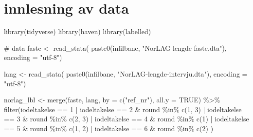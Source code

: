 \documentclass[
  letterpaper,
  DIV=11,
  numbers=noendperiod]{scrreprt}
\newenvironment{Shaded}{\begin{snugshade}}{\end{snugshade}}
\newcommand{\AttributeTok}[1]{\textcolor[rgb]{0.40,0.45,0.13}{#1}}
\newcommand{\CommentTok}[1]{\textcolor[rgb]{0.37,0.37,0.37}{#1}}
\newcommand{\ConstantTok}[1]{\textcolor[rgb]{0.56,0.35,0.01}{#1}}
\newcommand{\DecValTok}[1]{\textcolor[rgb]{0.68,0.00,0.00}{#1}}
\newcommand{\FunctionTok}[1]{\textcolor[rgb]{0.28,0.35,0.67}{#1}}
\newcommand{\NormalTok}[1]{\textcolor[rgb]{0.00,0.23,0.31}{#1}}
\newcommand{\OtherTok}[1]{\textcolor[rgb]{0.00,0.23,0.31}{#1}}
\newcommand{\SpecialCharTok}[1]{\textcolor[rgb]{0.37,0.37,0.37}{#1}}
\newcommand{\StringTok}[1]{\textcolor[rgb]{0.13,0.47,0.30}{#1}}
\theoremstyle{definition}
\theoremstyle{remark}
\begin{document}
\hypertarget{innlesning-av-data-2}{%
\section{innlesning av data}\label{innlesning-av-data-2}}

\begin{Shaded}
\begin{Highlighting}[]
\FunctionTok{library}\NormalTok{(tidyverse)}
\FunctionTok{library}\NormalTok{(haven)}
\FunctionTok{library}\NormalTok{(labelled)}


\CommentTok{\# data}
\NormalTok{faste }\OtherTok{\textless{}{-}} \FunctionTok{read\_stata}\NormalTok{( }\FunctionTok{paste0}\NormalTok{(infilbane, }\StringTok{"NorLAG{-}lengde{-}faste.dta"}\NormalTok{), }\AttributeTok{encoding =} \StringTok{"utf{-}8"}\NormalTok{)}

\NormalTok{lang }\OtherTok{\textless{}{-}} \FunctionTok{read\_stata}\NormalTok{( }\FunctionTok{paste0}\NormalTok{(infilbane, }\StringTok{"NorLAG{-}lengde{-}intervju.dta"}\NormalTok{), }\AttributeTok{encoding =} \StringTok{"utf{-}8"}\NormalTok{)}



\NormalTok{norlag\_lbl }\OtherTok{\textless{}{-}} \FunctionTok{merge}\NormalTok{(faste, lang, }\AttributeTok{by =} \FunctionTok{c}\NormalTok{(}\StringTok{"ref\_nr"}\NormalTok{), }\AttributeTok{all.y =} \ConstantTok{TRUE}\NormalTok{) }\SpecialCharTok{\%\textgreater{}\%} 
  \FunctionTok{filter}\NormalTok{(iodeltakelse }\SpecialCharTok{==} \DecValTok{1} \SpecialCharTok{|}  
\NormalTok{           iodeltakelse }\SpecialCharTok{==} \DecValTok{2} \SpecialCharTok{\&}\NormalTok{ round }\SpecialCharTok{\%in\%} \FunctionTok{c}\NormalTok{(}\DecValTok{1}\NormalTok{, }\DecValTok{3}\NormalTok{) }\SpecialCharTok{|} 
\NormalTok{           iodeltakelse }\SpecialCharTok{==} \DecValTok{3} \SpecialCharTok{\&}\NormalTok{ round }\SpecialCharTok{\%in\%} \FunctionTok{c}\NormalTok{(}\DecValTok{2}\NormalTok{, }\DecValTok{3}\NormalTok{) }\SpecialCharTok{|}
\NormalTok{           iodeltakelse }\SpecialCharTok{==} \DecValTok{4} \SpecialCharTok{\&}\NormalTok{ round }\SpecialCharTok{\%in\%} \FunctionTok{c}\NormalTok{(}\DecValTok{1}\NormalTok{) }\SpecialCharTok{|}
\NormalTok{           iodeltakelse }\SpecialCharTok{==} \DecValTok{5} \SpecialCharTok{\&}\NormalTok{ round }\SpecialCharTok{\%in\%} \FunctionTok{c}\NormalTok{(}\DecValTok{1}\NormalTok{, }\DecValTok{2}\NormalTok{) }\SpecialCharTok{|}
\NormalTok{           iodeltakelse }\SpecialCharTok{==} \DecValTok{6} \SpecialCharTok{\&}\NormalTok{ round }\SpecialCharTok{\%in\%} \FunctionTok{c}\NormalTok{(}\DecValTok{2}\NormalTok{)}
\NormalTok{  ) }




\end{Highlighting}
\end{Shaded}
\end{document}
